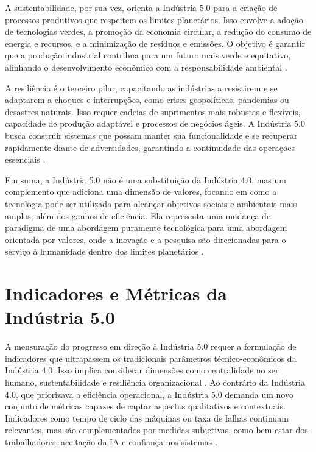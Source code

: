 A sustentabilidade, por sua vez, orienta a Indústria 5.0 para a criação de processos produtivos que respeitem os limites planetários.
Isso envolve a adoção de tecnologias verdes, a promoção da economia circular, a redução do consumo de energia e recursos, e a minimização de resíduos e emissões.
O objetivo é garantir que a produção industrial contribua para um futuro mais verde e equitativo, alinhando o desenvolvimento econômico com a responsabilidade ambiental \cite{euCommission2021, silva2024}.

A resiliência é o terceiro pilar, capacitando as indústrias a resistirem e se adaptarem a choques e interrupções, como crises geopolíticas, pandemias ou desastres naturais.
Isso requer cadeias de suprimentos mais robustas e flexíveis, capacidade de produção adaptável e processos de negócios ágeis.
A Indústria 5.0 busca construir sistemas que possam manter sua funcionalidade e se recuperar rapidamente diante de adversidades, garantindo a continuidade das operações essenciais \cite{euCommission2021, Khan2023}.

Em suma, a Indústria 5.0 não é uma substituição da Indústria 4.0, mas um complemento que adiciona uma dimensão de valores, focando em como a tecnologia pode ser utilizada para alcançar objetivos sociais e ambientais mais amplos, além dos ganhos de eficiência.
Ela representa uma mudança de paradigma de uma abordagem puramente tecnológica para uma abordagem orientada por valores, onde a inovação e a pesquisa são direcionadas para o serviço à humanidade dentro dos limites planetários \cite{Xu2021, VALETTE2023}.

\section{Indicadores e Métricas da Indústria 5.0}

A mensuração do progresso em direção à Indústria 5.0 requer a formulação de indicadores que ultrapassem os tradicionais parâmetros técnico-econômicos da Indústria 4.0.
Isso implica considerar dimensões como centralidade no ser humano, sustentabilidade e resiliência organizacional \cite{euCommission2021, Nahavandi2019}.
Ao contrário da Indústria 4.0, que priorizava a eficiência operacional, a Indústria 5.0 demanda um novo conjunto de métricas capazes de captar aspectos qualitativos e contextuais.
Indicadores como tempo de ciclo das máquinas ou taxa de falhas continuam relevantes, mas são complementados por medidas subjetivas, como bem-estar dos trabalhadores, aceitação da IA e confiança nos sistemas \cite{TOTH2023}.

